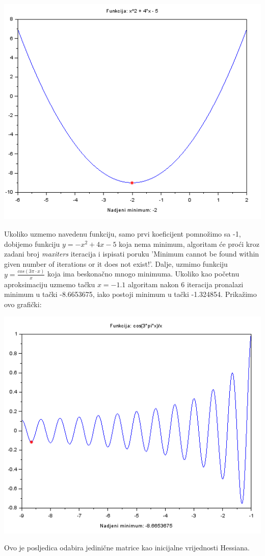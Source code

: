 \documentclass[bosnian,12pt,a4paper]{report}
\begin{document}
\begin{center}
   \includegraphics[scale=0.7]{parabola1.png}
\end{center}

\justify
Ukoliko uzmemo navedenu funkciju, samo prvi koeficijent pomnožimo sa -1, dobijemo funkciju $ y = -x^2 + 4x - 5 $ koja nema minimum, algoritam će proći kroz zadani broj \textit{maxiters} iteracija i ispisati poruku 'Minimum cannot be found within given number of iterations or it does not exist!'. 
\justify
Dalje, uzmimo funkciju $y = \frac{cos(3\pi\cdot x)}{x} $ koja ima beskonačno mnogo minimuma. Ukoliko kao početnu aproksimaciju uzmemo tačku $x = -1.1$ algoritam nakon 6 iteracija pronalazi minimum u tački -8.6653675, iako postoji minimum u tački -1.324854. Prikažimo ovo grafički:\\

\begin{center}
   \includegraphics[scale=0.7]{cos.png}
\end{center}
\justify
Ovo je posljedica odabira jedinične matrice kao inicijalne vrijednosti Hessiana.
\end{document}
